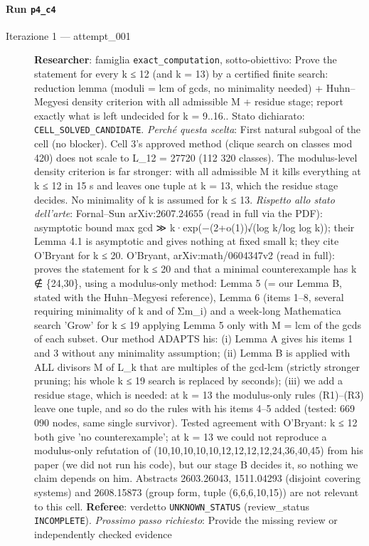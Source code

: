 \documentclass[11pt,a4paper]{article}
\begin{document}
\paragraph{Run \texttt{p4\_c4}}
\begin{description}
\item[Iterazione 1 — attempt\_001]
\textbf{Researcher}: famiglia \texttt{exact\_computation}, sotto-obiettivo: Prove the statement for every k ≤ 12 (and k = 13) by a certified finite search: reduction lemma (moduli = lcm of gcds, no minimality needed) + Huhn–Megyesi density criterion with all admissible M + residue stage; report exactly what is left undecided for k = 9..16.. Stato dichiarato: \texttt{CELL\_SOLVED\_CANDIDATE}.
\emph{Perché questa scelta}: First natural subgoal of the cell (no blocker). Cell 3's approved method (clique search on classes mod 420) does not scale to L\_12 = 27720 (112 320 classes). The modulus-level density criterion is far stronger: with all admissible M it kills everything at k ≤ 12 in 15 s and leaves one tuple at k = 13, which the residue stage decides. No minimality of k is assumed for k ≤ 13.
\emph{Rispetto allo stato dell'arte}: Fornal–Sun arXiv:2607.24655 (read in full via the PDF): asymptotic bound max gcd ≫ k·exp(−(2+o(1))√(log k/log log k)); their Lemma 4.1 is asymptotic and gives nothing at fixed small k; they cite O'Bryant for k ≤ 20. O'Bryant, arXiv:math/0604347v2 (read in full): proves the statement for k ≤ 20 and that a minimal counterexample has k ∉ \{24,30\}, using a modulus-only method: Lemma 5 (= our Lemma B, stated with the Huhn–Megyesi reference), Lemma 6 (items 1–8, several requiring minimality of k and of Σm\_i) and a week-long Mathematica search 'Grow' for k ≤ 19 applying Lemma 5 only with M = lcm of the gcds of each subset. Our method ADAPTS his: (i) Lemma A gives his items 1 and 3 without any minimality assumption; (ii) Lemma B is applied with ALL divisors M of L\_k that are multiples of the gcd-lcm (strictly stronger pruning; his whole k ≤ 19 search is replaced by seconds); (iii) we add a residue stage, which is needed: at k = 13 the modulus-only rules (R1)–(R3) leave one tuple, and so do the rules with his items 4–5 added (tested: 669 090 nodes, same single survivor). Tested agreement with O'Bryant: k ≤ 12 both give 'no counterexample'; at k = 13 we could not reproduce a modulus-only refutation of (10,10,10,10,10,12,12,12,12,24,36,40,45) from his paper (we did not run his code), but our stage B decides it, so nothing we claim depends on him. Abstracts 2603.26043, 1511.04293 (disjoint covering systems) and 2608.15873 (group form, tuple (6,6,6,10,15)) are not relevant to this cell.
\textbf{Referee}: verdetto \texttt{UNKNOWN\_STATUS} (review\_status \texttt{INCOMPLETE}).
\emph{Prossimo passo richiesto}: Provide the missing review or independently checked evidence
\end{description}
\end{document}
